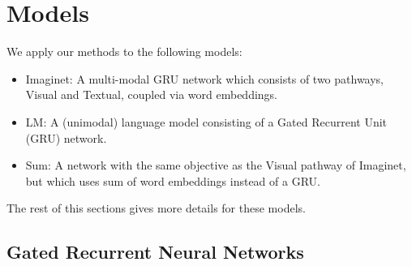 \section{Models}

We apply our methods to the following models:
\begin{itemize}
\item {\sc Imaginet}: A multi-modal GRU network which consists of two
  pathways, {\sc Visual} and {\sc Textual}, coupled via word
  embeddings.
\item {\sc LM}: A (unimodal) language model consisting of a Gated Recurrent
  Unit (GRU) network.
\item {\sc Sum}: A network with the same objective as the {\sc Visual}
  pathway of {\sc Imaginet}, but which uses sum of word embeddings
  instead of a GRU.
\end{itemize}
The rest of this sections gives more details for these models.

\subsection{Gated Recurrent Neural Networks}
\label{sec:gru}


